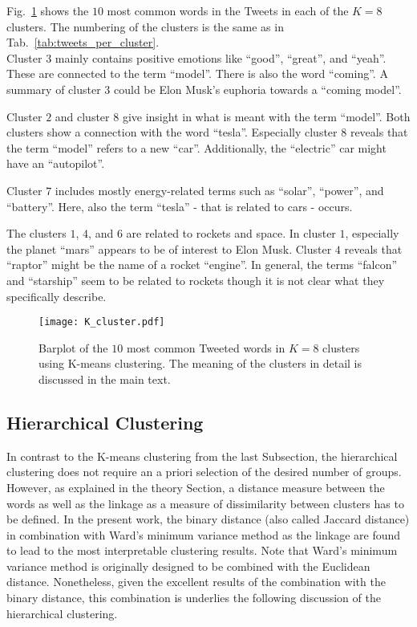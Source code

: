Fig.~\ref{fig:K_cluster} shows the $10$ most common words in the Tweets in each of the $K=8$ clusters. The numbering of the clusters is the same as in Tab.~\ref{tab:tweets_per_cluster}. \\

Cluster $3$ mainly contains positive emotions like \enquote{good}, \enquote{great}, and \enquote{yeah}. These are connected to the term \enquote{model}. There is also the word \enquote{coming}. A summary of cluster $3$ could be Elon Musk's euphoria towards a \enquote{coming model}. 

Cluster $2$ and cluster $8$ give insight in what is meant with the term \enquote{model}. Both clusters show a connection with the word \enquote{tesla}. Especially cluster $8$ reveals that the term \enquote{model} refers to a new \enquote{car}. Additionally, the \enquote{electric} car might have an \enquote{autopilot}. 

Cluster $7$ includes mostly energy-related terms such as \enquote{solar}, \enquote{power}, and \enquote{battery}. Here, also the term \enquote{tesla} - that is related to cars - occurs. 

The clusters $1$, $4$, and $6$ are related to rockets and space. In cluster $1$, especially the planet \enquote{mars} appears to be of interest to Elon Musk. Cluster $4$ reveals that \enquote{raptor} might be the name of a rocket \enquote{engine}. In general, the terms \enquote{falcon} and \enquote{starship} seem to be related to rockets though it is not clear what they specifically describe.

\begin{figure}[h!]
\centering
\texttt{[image: K\_cluster.pdf]}
\caption{Barplot of the $10$ most common Tweeted words in $K=8$ clusters using K-means clustering. The meaning of the clusters in detail is discussed in the main text.}
\label{fig:K_cluster}
\end{figure}

\subsection{Hierarchical Clustering}

In contrast to the K-means clustering from the last Subsection, the hierarchical clustering does not require an a priori selection of the desired number of groups. However, as explained in the theory Section, a distance measure between the words as well as the linkage as a measure of dissimilarity between clusters has to be defined. In the present work, the binary distance (also called Jaccard distance) in combination with Ward's minimum variance method as the linkage are found to lead to the most interpretable clustering results. Note that Ward's minimum variance method is originally designed to be combined with the Euclidean distance. Nonetheless, given the excellent results of the combination with the binary distance, this combination is underlies the following discussion of the hierarchical clustering.\\


